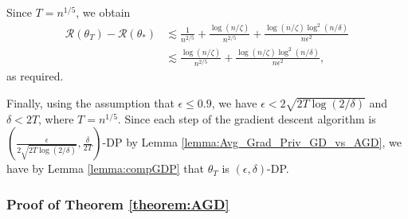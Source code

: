 \documentclass{article}
\begin{document}
Since $T = n^{1/5}$, we obtain
\begin{align*}
\mathcal{R}(\theta_T) - \mathcal{R}(\theta_*) &\lesssim \frac{1}{n^{2/5}} + \frac{\log(n/\zeta)}{n^{2/5}} + \frac{\log(n/\zeta)\log^2(n/\delta)}{n\epsilon^2}\\
&\lesssim \frac{\log(n/\zeta)}{n^{2/5}} + \frac{\log(n/\zeta)\log^2(n/\delta)}{n\epsilon^2},
\end{align*}
as required. 

Finally, using the assumption that $\epsilon \leq 0.9$, we have $\epsilon < 2\sqrt{2T\log(2/\delta)}$ and $\delta < 2T$, where $T = n^{1/5}$. Since each step of the gradient descent algorithm is $\left(\frac{\epsilon}{2\sqrt{2T\log(2/\delta)}}, \frac{\delta}{2T}\right)$-DP by Lemma \ref{lemma:Avg_Grad_Priv_GD_vs_AGD}, we have by Lemma \ref{lemma:compGDP} that $\theta_T$ is $(\epsilon, \delta)$-DP.


\subsubsection{Proof of Theorem \ref{theorem:AGD}}
\label{SecThmAGD}
\end{document}
